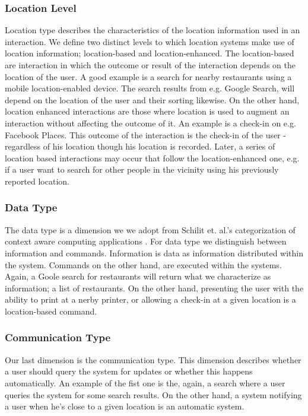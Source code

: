 \subsubsection{Location Level}
Location type describes the characteristics of the location information used in an interaction. We define two distinct levels to which location systems make use of location information; location-based and location-enhanced. The location-based are interaction in which the outcome or result of the interaction depends on the location of the user. A good example is a search for nearby restaurants using a mobile location-enabled device. The search results from e.g. Google Search, will depend on the location of the user and their sorting likewise. On the other hand, location enhanced interactions are those where location is used to augment an interaction without affecting the outcome of it. An example is a check-in on e.g. Facebook Places. This outcome of the interaction is the check-in of the user - regardless of his location though his location is recorded. Later, a series of location based interactions may occur that follow the location-enhanced one, e.g. if a user want to search for other people in the vicinity using his previously reported location.

\subsubsection{Data Type}
The data type is a dimension we we adopt from Schilit et. al.'s categorization of context aware computing applications \cite{512740}. For data type we distinguish between information and commands. Information is data as information distributed within the system. Commands on the other hand, are executed within the systems. Again, a Goole search for restaurants will return what we characterize as information; a list of restaurants. On the other hand, presenting the user with the ability to print at a nerby printer, or allowing a check-in at a given location is a location-based command.

\subsubsection{Communication Type}
Our last dimension is the communication type. This dimension describes whether a user should query the system for updates or whether this happens automatically. An example of the fist one is the, again, a search where a user queries the system for some search results. On the other hand, a system notifying a user when he's close to a given location is an automatic system.  

